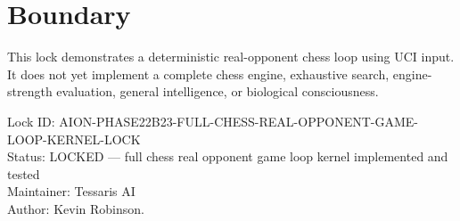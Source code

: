 \documentclass[11pt,a4paper]{article}
\begin{document}
\section{Boundary}

This lock demonstrates a deterministic real-opponent chess loop using UCI input. It does not yet implement a complete chess engine, exhaustive search, engine-strength evaluation, general intelligence, or biological consciousness.

\bigskip

\noindent
Lock ID: AION-PHASE22B23-FULL-CHESS-REAL-OPPONENT-GAME-LOOP-KERNEL-LOCK\\
Status: LOCKED --- full chess real opponent game loop kernel implemented and tested\\
Maintainer: Tessaris AI\\
Author: Kevin Robinson.
\end{document}
